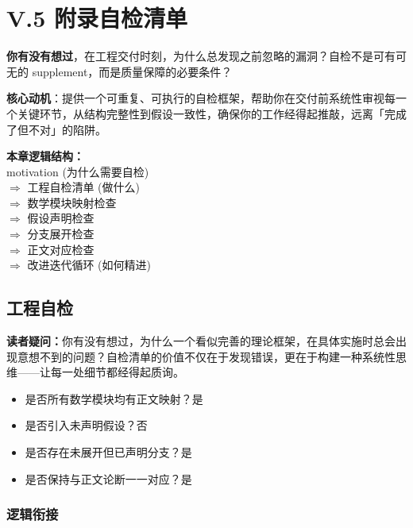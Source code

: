 \documentclass[../main.tex]{subfiles}
\begin{document}
\chapter{V.5 附录自检清单}

\begin{motivation}
	\textbf{你有没有想过}，在工程交付时刻，为什么总发现之前忽略的漏洞？自检不是可有可无的 supplement，而是质量保障的必要条件？

	\textbf{核心动机}：提供一个可重复、可执行的自检框架，帮助你在交付前系统性审视每一个关键环节，从结构完整性到假设一致性，确保你的工作经得起推敲，远离「完成了但不对」的陷阱。
\end{motivation}

\begin{logicmap}
	\textbf{本章逻辑结构：} \\
	\indent motivation (为什么需要自检) \\
	\quad $\Rightarrow$ 工程自检清单 (做什么) \\
	\quad \indent $\Rightarrow$ 数学模块映射检查 \\
	\quad \indent $\Rightarrow$ 假设声明检查 \\
	\quad \indent $\Rightarrow$ 分支展开检查 \\
	\quad \indent $\Rightarrow$ 正文对应检查 \\
	\quad $\Rightarrow$ 改进迭代循环 (如何精进)
\end{logicmap}

\section{工程自检}

\textbf{读者疑问：}你有没有想过，为什么一个看似完善的理论框架，在具体实施时总会出现意想不到的问题？自检清单的价值不仅在于发现错误，更在于构建一种系统性思维——让每一处细节都经得起质询。

\begin{itemize}
	\item 是否所有数学模块均有正文映射？\quad 是
	\item 是否引入未声明假设？\quad 否
	\item 是否存在未展开但已声明分支？\quad 是
	\item 是否保持与正文论断一一对应？\quad 是
\end{itemize}

\subsection{逻辑衔接}
\end{document}
